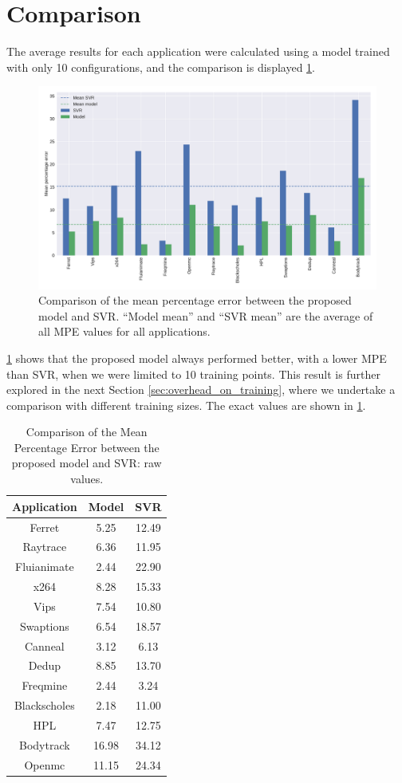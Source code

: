 \section{Comparison} \label{sec:comparison}
The average results for each application were calculated using a model trained with only 10 configurations, and the comparison is displayed \cref{fig:mpe_svr_eq}. %
\begin{figure}[H]
	\centering
	\includegraphics[width=.8\columnwidth]{models/figures/mpe_svr_eq.pdf}
	\caption{Comparison of the mean percentage error between the proposed model and SVR. ``Model mean'' and ``SVR mean'' are the average of all MPE values for all applications.
	}
	\label{fig:mpe_svr_eq}
\end{figure}

\cref{fig:mpe_svr_eq} shows that the proposed model always performed better, with a lower MPE than SVR, when we were limited to 10 training points. This result is further explored in the next Section \ref{sec:overhead_on_training}, where we undertake a comparison with different training sizes. The exact values are shown in \cref{tab:mpe_svr_eq}.

\begin{table}[H]
\centering
\begin{tabular}{c|c|c}
\hline
Application  & Model & SVR   \\ \hline
Ferret       & 5.25     & 12.49  \\ 
Raytrace     & 6.36     & 11.95  \\
Fluianimate  & 2.44     & 22.90  \\
x264         & 8.28     & 15.33  \\
Vips         & 7.54     & 10.80  \\
Swaptions    & 6.54     & 18.57  \\
Canneal      & 3.12     & 6.13   \\
Dedup        & 8.85     & 13.70  \\
Freqmine     & 2.44     & 3.24   \\
Blackscholes & 2.18     & 11.00  \\
HPL          & 7.47     & 12.75  \\
Bodytrack    & 16.98    & 34.12  \\
Openmc       & 11.15    & 24.34  \\
\end{tabular}
\caption{Comparison of the Mean Percentage Error between the proposed model and SVR: raw values.}
\label{tab:mpe_svr_eq}
\end{table}

